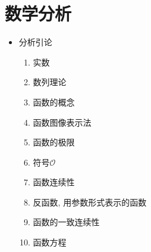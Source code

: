 \section{数学分析}
\begin{itemize}
 \item 分析引论
 \begin{enumerate}[1.]
  \item 实数
  \item 数列理论
  \item 函数的概念
  \item 函数图像表示法
  \item 函数的极限
  \item 符号$\mathscr{O}$
  \item 函数连续性
  \item 反函数, 用参数形式表示的函数
  \item 函数的一致连续性
  \item 函数方程
 \end{enumerate}
\end{itemize}
\ed

